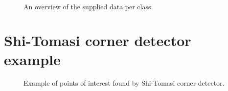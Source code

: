 \begin{figure}[H]
    \captionsetup{width=0.85\linewidth}
    \captionsetup{justification=centering}
    \caption{An overview of the supplied data per class.}
    \label{fig:1-data_analysis-labeled_data_overview.png}
\end{figure}


\section*{Shi-Tomasi corner detector example}

\begin{figure}[H]
    \captionsetup{width=0.85\linewidth}
    \captionsetup{justification=centering}
    \caption{Example of points of interest found by Shi-Tomasi corner detector.}
\end{figure}

